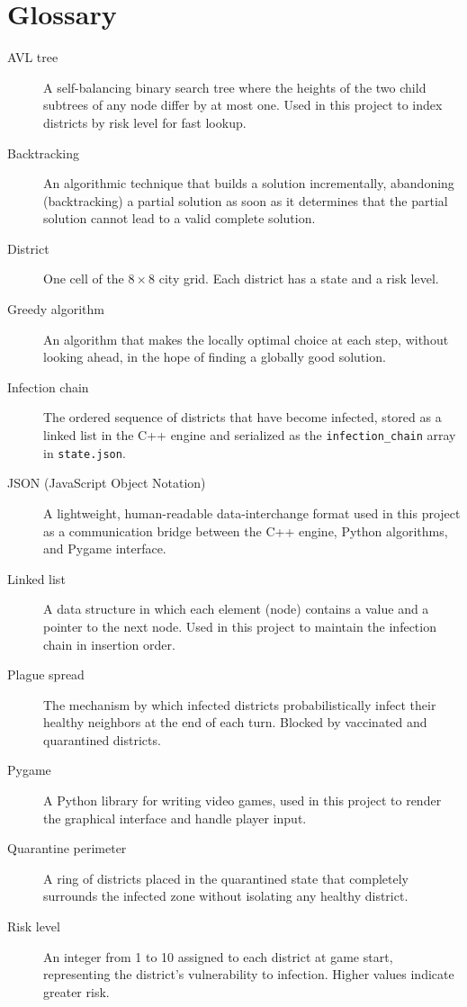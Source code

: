 \documentclass[12pt, a4paper]{article}
\begin{document}
\newpage
\section*{Glossary}

\begin{description}
  \item[AVL tree] A self-balancing binary search tree where the heights of
        the two child subtrees of any node differ by at most one. Used in
        this project to index districts by risk level for fast lookup.
  \item[Backtracking] An algorithmic technique that builds a solution
        incrementally, abandoning (backtracking) a partial solution as soon
        as it determines that the partial solution cannot lead to a valid
        complete solution.
  \item[District] One cell of the $8\times8$ city grid. Each district has
        a state and a risk level.
  \item[Greedy algorithm] An algorithm that makes the locally optimal
        choice at each step, without looking ahead, in the hope of finding
        a globally good solution.
  \item[Infection chain] The ordered sequence of districts that have become
        infected, stored as a linked list in the C++ engine and serialized
        as the \texttt{infection\_chain} array in \texttt{state.json}.
  \item[JSON (JavaScript Object Notation)] A lightweight, human-readable
        data-interchange format used in this project as a communication
        bridge between the C++ engine, Python algorithms, and Pygame
        interface.
  \item[Linked list] A data structure in which each element (node) contains
        a value and a pointer to the next node. Used in this project to
        maintain the infection chain in insertion order.
  \item[Plague spread] The mechanism by which infected districts
        probabilistically infect their healthy neighbors at the end of each
        turn. Blocked by vaccinated and quarantined districts.
  \item[Pygame] A Python library for writing video games, used in this
        project to render the graphical interface and handle player input.
  \item[Quarantine perimeter] A ring of districts placed in the
        quarantined state that completely surrounds the infected zone
        without isolating any healthy district.
  \item[Risk level] An integer from 1 to 10 assigned to each district at
        game start, representing the district's vulnerability to infection.
        Higher values indicate greater risk.
\end{description}
\end{document}
